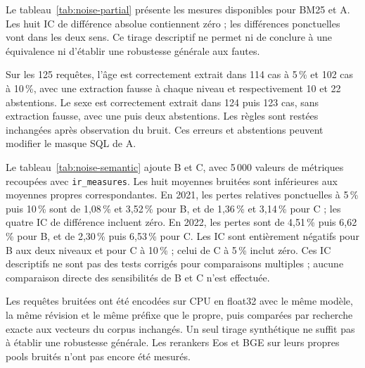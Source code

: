 \documentclass{article}
\begin{document}
Le tableau~\ref{tab:noise-partial} présente les mesures disponibles pour BM25 et A. Les huit IC de différence absolue contiennent zéro ; les différences ponctuelles vont dans les deux sens. Ce tirage descriptif ne permet ni de conclure à une équivalence ni d'établir une robustesse générale aux fautes.

Sur les 125 requêtes, l'âge est correctement extrait dans 114 cas à 5\,\% et 102 cas à 10\,\%, avec une extraction fausse à chaque niveau et respectivement 10 et 22 abstentions. Le sexe est correctement extrait dans 124 puis 123 cas, sans extraction fausse, avec une puis deux abstentions. Les règles sont restées inchangées après observation du bruit. Ces erreurs et abstentions peuvent modifier le masque SQL de A.

Le tableau~\ref{tab:noise-semantic} ajoute B et C, avec 5\,000 valeurs de métriques recoupées avec \texttt{ir\_measures}. Les huit moyennes bruitées sont inférieures aux moyennes propres correspondantes. En 2021, les pertes relatives ponctuelles à 5\,\% puis 10\,\% sont de 1,08\,\% et 3,52\,\% pour B, et de 1,36\,\% et 3,14\,\% pour C ; les quatre IC de différence incluent zéro. En 2022, les pertes sont de 4,51\,\% puis 6,62\,\% pour B, et de 2,30\,\% puis 6,53\,\% pour C. Les IC sont entièrement négatifs pour B aux deux niveaux et pour C à 10\,\% ; celui de C à 5\,\% inclut zéro. Ces IC descriptifs ne sont pas des tests corrigés pour comparaisons multiples ; aucune comparaison directe des sensibilités de B et C n'est effectuée.

Les requêtes bruitées ont été encodées sur CPU en float32 avec le même modèle, la même révision et le même préfixe que le propre, puis comparées par recherche exacte aux vecteurs du corpus inchangés. Un seul tirage synthétique ne suffit pas à établir une robustesse générale. Les rerankers Eos et BGE sur leurs propres pools bruités n'ont pas encore été mesurés.
\end{document}
